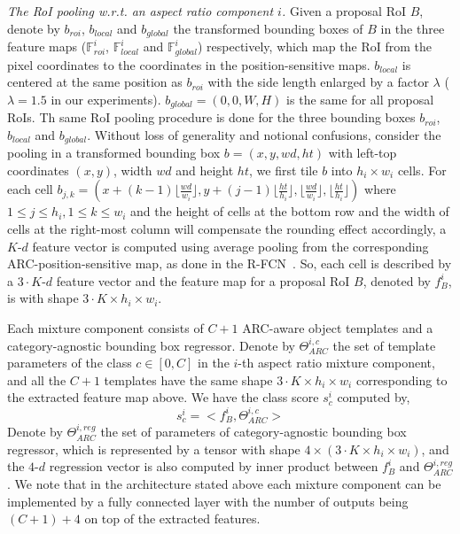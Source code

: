\documentclass[10pt,twocolumn,letterpaper]{article}
\begin{document}
\textit{The RoI pooling w.r.t. an aspect ratio component $i$.} Given a proposal RoI $B$, denote by $b_{roi}$, $b_{local}$ and $b_{global}$ the transformed bounding boxes of $B$ in the three feature maps ($\mathbb{F}^i_{roi}$,  $\mathbb{F}^i_{local}$ and $\mathbb{F}^i_{global}$) respectively, which map the RoI from the pixel coordinates to the coordinates in the position-sensitive maps. $b_{local}$ is centered at the same position as $b_{roi}$ with the side length enlarged by a factor $\lambda$ ($\lambda=1.5$ in our experiments). $b_{global}=(0, 0, W, H)$ is the same for all proposal RoIs. Th same RoI pooling procedure is done for the three bounding boxes $b_{roi}$, $b_{local}$ and $b_{global}$. Without loss of generality and notional confusions, consider the pooling in a transformed bounding box $b=(x,y,wd,ht)$ with left-top coordinates $(x,y)$, width $wd$ and height $ht$, we first tile $b$ into $h_i\times w_i$ cells.  For each cell $b_{j,k}=(x+(k-1)\lfloor \frac{wd}{w_i} \rfloor, y+(j-1)\lfloor \frac{ht}{h_i}\rfloor, \lfloor \frac{wd}{w_i} \rfloor, \lfloor \frac{ht}{h_i}\rfloor)$ where $1\leq j \leq h_i, 1\leq k \leq w_i$ and the height of cells at the bottom row and the width of cells at the right-most column will compensate the rounding effect accordingly, a $K$-$d$ feature vector is computed using average pooling from the corresponding ARC-position-sensitive map, as done in the R-FCN~\cite{rfcn}. So, each cell is described by a $3\cdot K$-$d$ feature vector and the feature map for a proposal RoI $B$, denoted by $f^i_B$, is with shape $3\cdot K\times h_i \times w_i$. 


Each mixture component consists of $C+1$ ARC-aware object templates and a category-agnostic bounding box regressor.  Denote by $\Theta^{i,c}_{ARC}$ the set of template parameters of the class $c \in [0, C]$ in  the $i$-th aspect ratio mixture component, and all the $C+1$ templates have the same shape $3\cdot K \times h_i \times w_i$ corresponding to the extracted feature map above.  We have the class score $s_c^i$ computed by, 
\begin{equation}
s_c^i = <f^i_B, \Theta^{i,c}_{ARC}>
\end{equation}
Denote by $\Theta^{i, reg}_{ARC}$ the set of parameters of category-agnostic bounding box regressor, which is represented by a tensor with shape $4\times (3\cdot K \times h_i \times w_i)$, and the $4$-$d$ regression vector is also computed by inner product between $f^i_B$ and $\Theta^{i, reg}_{ARC}$. 
We note that in the architecture stated above each mixture component can be implemented by a fully connected layer with the number of outputs being $(C+1)+4$ on top of the extracted features. 
\end{document}
